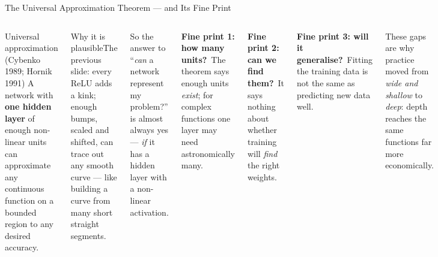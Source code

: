 \documentclass[aspectratio=169,10pt]{beamer}
\begin{document}
\begin{frame}{The Universal Approximation Theorem --- and Its Fine Print}
\begin{columns}[T]
\begin{fbx}{Universal approximation (Cybenko 1989; Hornik 1991)}
A network with \textbf{one hidden layer} of enough non-linear units can approximate any continuous function on a bounded region to any desired accuracy.
\end{fbx}
\begin{cbox}{Why it is plausible}\scriptsize The previous slide: every ReLU adds a kink; enough bumps, scaled and shifted, can trace out any smooth curve --- like building a curve from many short straight segments.\end{cbox}
\begin{rbox}\scriptsize So the answer to ``\emph{can} a network represent my problem?'' is almost always yes --- \emph{if} it has a hidden layer with a non-linear activation.\end{rbox}
\begin{wbox}\textbf{Fine print 1: how many units?}\ \scriptsize The theorem says enough units \emph{exist}; for complex functions one layer may need astronomically many.\end{wbox}
\begin{wbox}\textbf{Fine print 2: can we find them?}\ \scriptsize It says nothing about whether training will \emph{find} the right weights.\end{wbox}
\begin{wbox}\textbf{Fine print 3: will it generalise?}\ \scriptsize Fitting the training data is not the same as predicting new data well.\end{wbox}
\begin{ibox}\scriptsize These gaps are why practice moved from \emph{wide and shallow} to \emph{deep}: depth reaches the same functions far more economically.\end{ibox}
\end{columns}
\end{frame}
\end{document}
